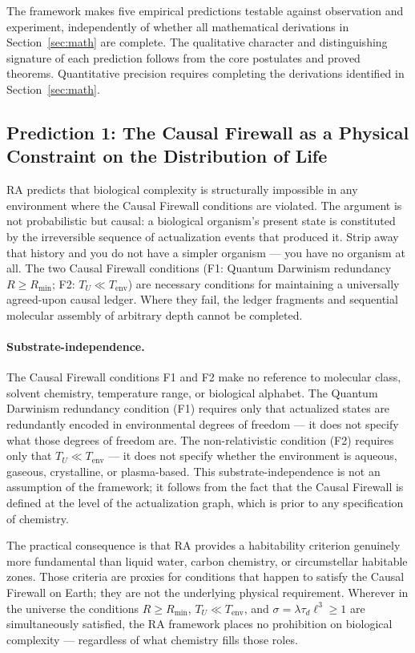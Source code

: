 \documentclass[11pt,a4paper]{article}
\theoremstyle{plain}
\theoremstyle{definition}
\theoremstyle{remark}
\begin{document}
The framework makes five empirical predictions testable against observation and
experiment, independently of whether all mathematical derivations in
Section~\ref{sec:math} are complete. The qualitative character and distinguishing
signature of each prediction follows from the core postulates and proved theorems.
Quantitative precision requires completing the derivations identified in
Section~\ref{sec:math}.

\subsection{Prediction 1: The Causal Firewall as a Physical Constraint on the
Distribution of Life}

RA predicts that biological complexity is structurally impossible in any
environment where the Causal Firewall conditions are violated. The argument is not
probabilistic but causal: a biological organism's present state is constituted by
the irreversible sequence of actualization events that produced it. Strip away that
history and you do not have a simpler organism --- you have no organism at all.
The two Causal Firewall conditions (F1: Quantum Darwinism redundancy $R \geq
R_{\min}$; F2: $T_U \ll T_{\mathrm{env}}$) are necessary conditions for
maintaining a universally agreed-upon causal ledger. Where they fail, the ledger
fragments and sequential molecular assembly of arbitrary depth cannot be
completed.

\paragraph{Substrate-independence.}
The Causal Firewall conditions F1 and F2 make no reference to molecular class,
solvent chemistry, temperature range, or biological alphabet. The Quantum Darwinism
redundancy condition (F1) requires only that actualized states are redundantly
encoded in environmental degrees of freedom --- it does not specify what those
degrees of freedom are. The non-relativistic condition (F2) requires only that
$T_U \ll T_{\mathrm{env}}$ --- it does not specify whether the environment is
aqueous, gaseous, crystalline, or plasma-based. This substrate-independence is not
an assumption of the framework; it follows from the fact that the Causal Firewall
is defined at the level of the actualization graph, which is prior to any
specification of chemistry.

The practical consequence is that RA provides a habitability criterion genuinely
more fundamental than liquid water, carbon chemistry, or circumstellar habitable
zones. Those criteria are proxies for conditions that happen to satisfy the Causal
Firewall on Earth; they are not the underlying physical requirement. Wherever in
the universe the conditions $R \geq R_{\min}$, $T_U \ll T_{\mathrm{env}}$, and
$\sigma = \lambda\tau_d\ell^3 \geq 1$ are simultaneously satisfied, the RA
framework places no prohibition on biological complexity --- regardless of what
chemistry fills those roles.
\end{document}
